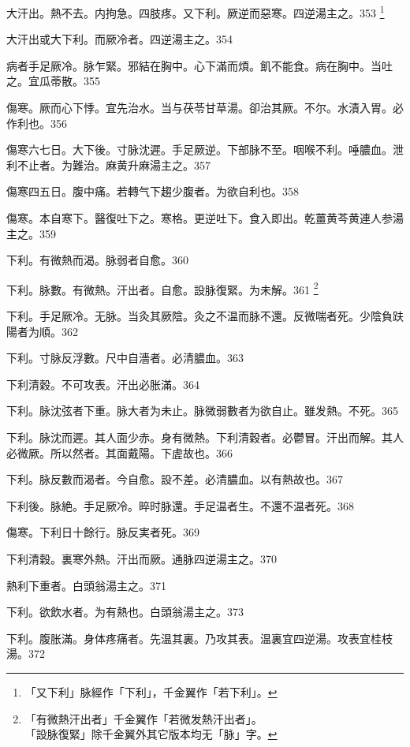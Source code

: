 \documentclass[b5paper,twoside,zihao=-4,UTF8]{ctexbook}
\begin{document}
大汗出。熱不去。内拘急。四肢疼。{又}下利。厥逆而惡寒。四逆湯主之。353
	\footnote{「又下利」脉經作「下利」，千金翼作「若下利」。}

大汗{出}或大下利。而厥冷者。四逆湯主之。354

病者手足厥冷。脉乍緊。邪結在胸中。心下滿而煩。飢不能食。病在胸中。当吐之。宜瓜蒂散。355

傷寒。厥而心下悸。宜先治水。当与茯苓甘草湯。卻治其厥。不尔。水漬入胃。必作利也。356

傷寒六七日。大下後。{寸}脉沈遲。手足厥逆。下部脉不至。咽喉不利。唾膿血。泄利不止者。为難治。麻黄升麻湯主之。357

傷寒四五日。腹中痛。若轉气下趨少腹者。为欲自利也。358

傷寒。本自寒下。醫復吐{下}之。寒格。更逆吐{下}。食入即出。乾薑黄芩黄連人参湯主之。359

下利。有微熱而渴。脉弱者自愈。360

下利。脉數。有微熱。汗出者。自愈。設{脉}復緊。为未解。361
	\footnote{「有微熱汗出者」千金翼作「若微发熱汗出者」。\\「設脉復緊」除千金翼外其它版本均无「脉」字。}

下利。手足厥{冷}。无脉。{当灸其厥陰。}灸之不温{而脉不還}。反微喘者死。少陰負趺陽者为順。362

下利。寸脉反浮數。尺中自濇者。必清膿血。363

下利清穀。不可攻表。汗出必胀滿。364

下利。脉沈弦者下重。脉大者为未止。脉微弱數者为欲自止。雖发熱。不死。365

下利。脉沈而遲。其人面少赤。身有微熱。下利清穀者。必鬱冒。汗出而解。其人必微厥。所以然者。其面戴陽。下虗故也。366

下利。脉反數而渴者。今自愈。設不差。必清膿血。以有熱故也。367

下利後。脉絶。手足厥{冷}。晬时脉還。手足温者生。不還{不温}者死。368

傷寒。下利日十餘行。脉反実者死。369

下利清穀。裏寒外熱。汗出而厥。通脉四逆湯主之。370

熱利下重者。白頭翁湯主之。371

下利。欲飲水者。为有熱也。白頭翁湯主之。373

下利。腹{胀}滿。身体疼痛者。先温其裏。乃攻其表。温裏宜四逆湯。攻表宜桂枝湯。372
\end{document}
